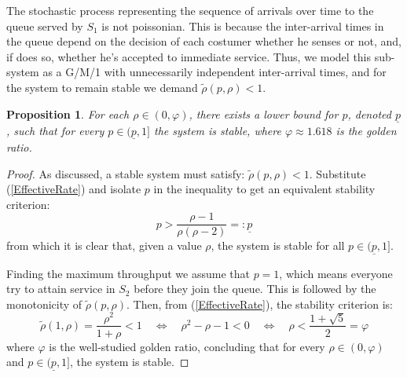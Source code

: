 \documentclass[11pt]{article}
\numberwithin{equation}{section}
\newtheorem{proposition}{Proposition}[section]
\begin{document}
The stochastic process representing the sequence of arrivals over time to the queue served by $S_{1}$ is not poissonian. This is because the inter-arrival times in the queue depend on the decision of each costumer whether he senses or not, and, if does so, whether he's accepted to immediate service. Thus, we model this sub-system as a G/M/1 with unnecessarily independent inter-arrival times, and for the system to remain stable we demand $\tilde{\rho}(p,\rho) < 1$.

\begin{proposition}
For each $\rho\in(0,\varphi)$, there exists a lower bound for $p$, denoted $\underline{p}$, such that for every $p \in (\underline{p}, 1]$ the system is stable, where
$\varphi \approx 1.618$ is the golden ratio.
\end{proposition}

\begin{proof}
As discussed, a stable system must satisfy: $\tilde{\rho}(p,\rho) < 1$. Substitute (\ref{EffectiveRate}) and isolate $p$ in the inequality to get an equivalent stability criterion:
\[ p > \frac{\rho - 1}{\rho(\rho-2)} =: \underline{p}\]
from which it is clear that, given a value $\rho$, the system is stable for all $p \in (\underline{p},1]$.

Finding the maximum throughput we assume that $p=1$, which means everyone try to attain service in $S_{2}$ before they join the queue. This is followed by the monotonicity of $\tilde{\rho}(p,\rho)$. Then, from (\ref{EffectiveRate}), the stability criterion is:
\[ \tilde{\rho}(1,\rho)=\frac{\rho^2}{1+\rho}<1 \quad\Leftrightarrow\quad \rho^2-\rho-1<0 \quad\Leftrightarrow\quad \rho < \frac{1+\sqrt{5}}{2}=\varphi \]
where $\varphi$ is the well-studied golden ratio, concluding that for every $\rho\in(0,\varphi)$ and $p \in (\underline{p},1]$, the system is stable.
\end{proof}

\newpage
\end{document}
